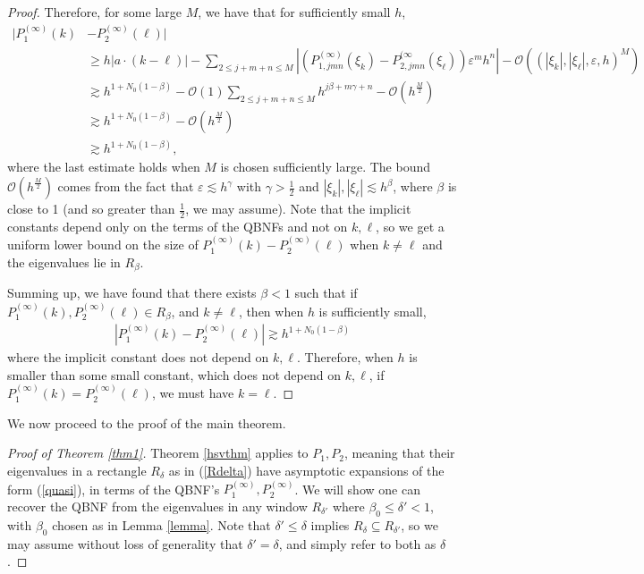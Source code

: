 \documentclass[12pt,lettersize]{article}
\renewcommand{\epsilon}{\varepsilon}
\theoremstyle{plain}%
\numberwithin{theorem}{section}
\numberwithin{equation}{section}
\theoremstyle{definition}
\theoremstyle{remark}
\begin{document}
{\begin{proof}
Therefore, for some large $M$, we have that for sufficiently small $h$, 
%
\begin{align*}
|P^{(\infty)}_1(k)&-P^{(\infty)}_2(\ell)| \\
&\geq h|a\cdot(k-\ell)| - \sum_{2 \leq j + m + n \leq M} |(P^{(\infty)}_{1,jmn}(\xi_k)-P^{(\infty}_{2,jmn}(\xi_\ell)) \epsilon^m h^n| - \mathcal{O}((|\xi_k|,|\xi_\ell|,\epsilon,h)^M) \\
&\gtrsim h^{1+{N_0}(1-\beta)} - \mathcal{O}(1) \sum_{2 \leq j+ m + n \leq M} h^{j\beta + m\gamma +n} - \mathcal{O}(h^{\frac{M}{2}}) \\
&\gtrsim h^{1+N_0(1-\beta)} - \mathcal{O}(h^{\frac{M}{2}}) \\
&\gtrsim h^{1+N_0(1-\beta)},
\end{align*}
%
where the last estimate holds when $M$ is chosen sufficiently large. The bound $\mathcal{O}(h^\frac{M}{2})$ comes from the fact that $\epsilon \lesssim h^\gamma$ with $\gamma > \frac{1}{2}$ and $|\xi_k|,|\xi_\ell| \lesssim h^\beta$, where $\beta$ is close to 1 (and so greater than $\frac{1}{2}$, we may assume).  Note that the implicit constants depend only on the terms of the QBNFs and not on $k,\ell$, so we get a uniform lower bound on the size of $P^{(\infty)}_1(k)-P^{(\infty)}_2(\ell)$ when $k \neq \ell$ and the eigenvalues lie in $R_\beta$. 

Summing up, we have found that there exists $\beta < 1$ such that if $P^{(\infty)}_1(k),P^{(\infty)}_2(\ell) \in R_\beta$, and $k\neq \ell$, then when $h$ is sufficiently small,
%
\begin{align*}
|P^{(\infty)}_1(k)-P^{(\infty)}_2(\ell)| \gtrsim h^{1+N_0(1-\beta)}
\end{align*}
%
where the implicit constant does not depend on $k,\ell$. Therefore, when $h$ is smaller than some small constant, which does not depend on $k,\ell$, if $P^{(\infty)}_1(k) = P^{(\infty)}_2(\ell)$, we must have $k = \ell$. 

\end{proof}

We now proceed to the proof of the main theorem. 

\begin{proof}[Proof of Theorem \ref{thm1}]
Theorem \ref{hsvthm} applies to $P_1,P_2$, meaning that their eigenvalues in a rectangle $R_\delta$ as in (\ref{Rdelta}) have asymptotic expansions of the form (\ref{quasi}), in terms of the QBNF's $P^{(\infty)}_1,P^{(\infty)}_2$. We will show one can recover the QBNF from the eigenvalues in any window $R_{\delta'}$ where $\beta_0 \leq \delta' < 1$, with $\beta_0$ chosen as in Lemma \ref{lemma}. Note that $\delta' \leq \delta$ implies $R_{\delta} \subseteq R_{\delta'}$, so we may assume without loss of generality that $\delta' = \delta$, and simply refer to both as $\delta$.


\end{proof}}
\end{document}
